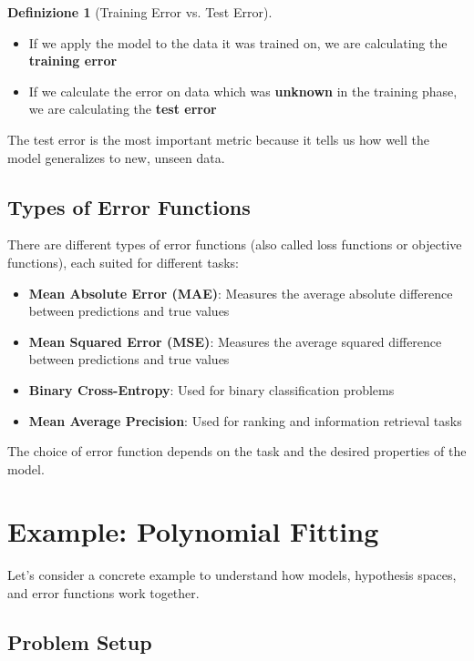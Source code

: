 \documentclass[11pt,a4paper]{article}
\theoremstyle{definition}
\newtheorem{definition}{Definizione}[section]
\theoremstyle{plain}
\theoremstyle{remark}
\begin{document}
\begin{definition}[Training Error vs. Test Error]
\begin{itemize}
    \item If we apply the model to the data it was trained on, we are calculating the \textbf{training error}
    \item If we calculate the error on data which was \textbf{unknown} in the training phase, we are calculating the \textbf{test error}
\end{itemize}
\end{definition}

The test error is the most important metric because it tells us how well the model generalizes to new, unseen data.

\subsection{Types of Error Functions}

There are different types of error functions (also called loss functions or objective functions), each suited for different tasks:

\begin{itemize}
    \item \textbf{Mean Absolute Error (MAE)}: Measures the average absolute difference between predictions and true values
    \item \textbf{Mean Squared Error (MSE)}: Measures the average squared difference between predictions and true values
    \item \textbf{Binary Cross-Entropy}: Used for binary classification problems
    \item \textbf{Mean Average Precision}: Used for ranking and information retrieval tasks
\end{itemize}

The choice of error function depends on the task and the desired properties of the model.

\section{Example: Polynomial Fitting}

Let's consider a concrete example to understand how models, hypothesis spaces, and error functions work together.

\subsection{Problem Setup}
\end{document}
